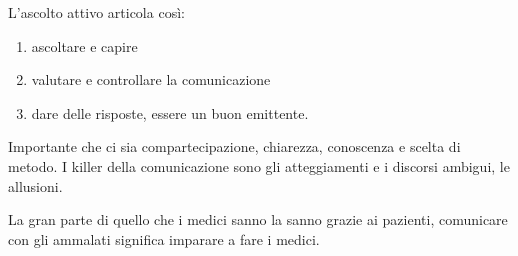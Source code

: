 \documentclass[]{article}
\begin{document}
L'ascolto attivo articola così:

\begin{enumerate}
\def\labelenumi{\arabic{enumi}.}
\item
  ascoltare e capire
\item
  valutare e controllare la comunicazione
\item
  dare delle risposte, essere un buon emittente.
\end{enumerate}

Importante che ci sia compartecipazione, chiarezza, conoscenza e scelta
di metodo. I killer della comunicazione sono gli atteggiamenti e i
discorsi ambigui, le allusioni.

La gran parte di quello che i medici sanno la sanno grazie ai pazienti,
comunicare con gli ammalati significa imparare a fare i medici.
\end{document}
